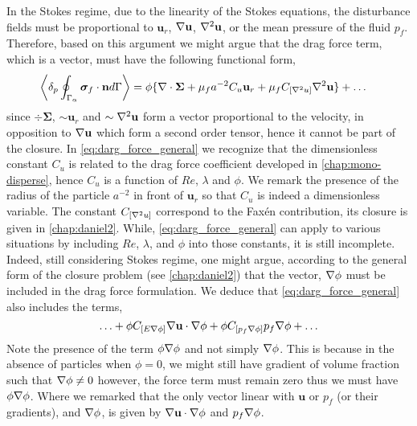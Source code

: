 In the Stokes regime, due to the linearity of the Stokes equations, the disturbance fields must be proportional to $\textbf{u}_{r}$, $\mathbf{\nabla} \textbf{u}$, $\mathbf{\nabla}^2 \textbf{u}$, or the mean pressure of the fluid $p_f$. 
Therefore, based on this argument we might argue that the drag force term, which is a vector, must have the following functional form, 
\begin{align}
    \pSavg{\bm\sigma_f\cdot \textbf{n}} &= 
    \phi \{
    \div \bm\Sigma
    + 
    \mu_f a^{-2}
    C_u \textbf{u}_{r}
    +\mu_f C_{[\grad^2 u]} \grad^2 \textbf{u}
    \} + \ldots
    \label{eq:darg_force_general}
\end{align}
since $\div \bm\Sigma$, $\sim \textbf{u}_r$ and  $\sim \mathbf{\nabla}^2 \textbf{u}$ form a vector proportional to the velocity, in opposition to $\mathbf{\nabla} \textbf{u}$ which form a second order tensor, hence it cannot be part of the closure. 
In \ref{eq:darg_force_general} we recognize that the dimensionless constant $C_u$ is related to the drag force coefficient developed in \ref{chap:mono-disperse}, hence $C_u$ is a function of $Re$, $\lambda$ and $\phi$.
We remark the presence of the radius of the particle $a^{-2}$ in front of $\textbf{u}_r$ so that $C_u$ is indeed a dimensionless variable. 
The constant $C_{[\mathbf{\nabla}^2 u]}$ correspond to the Fax\'en contribution, its closure is given in \ref{chap:daniel2}.
While, \ref{eq:darg_force_general} can apply to various situations by including $Re$, $\lambda$, and $\phi$ into those constants, it is still incomplete. 
Indeed, still considering Stokes regime, one might argue, according to the general form of the closure problem (see \ref{chap:daniel2}) that the vector, $\mathbf{\nabla} \phi$ must be included in the drag force formulation. 
We deduce that \ref{eq:darg_force_general} also includes the terms, 
\begin{equation}
    \ldots 
    +
    \phi C_{[E \grad\phi ]} \grad \textbf{u} \cdot \grad \phi 
    + \phi C_{[p_f \grad\phi ]} p_f \grad \phi 
    + \ldots
    \label{eq:drag_inhomo}
\end{equation}
Note the presence of the term $\phi \mathbf{\nabla} \phi$ and not simply $\mathbf{\nabla} \phi$. 
This is because in the absence of particles when $\phi=0$, we might still have gradient of volume fraction such that $\mathbf{\nabla} \phi \neq 0$ however, the force term must remain zero thus we must have $\phi\mathbf{\nabla}\phi$. 
Where  we remarked that the only vector linear with $\textbf{u}$ or $p_f$ (or their gradients), and $\mathbf{\nabla} \phi$, is given by $\mathbf{\nabla} \textbf{u} \cdot \mathbf{\nabla} \phi$ and $p_f \mathbf{\nabla} \phi$.
